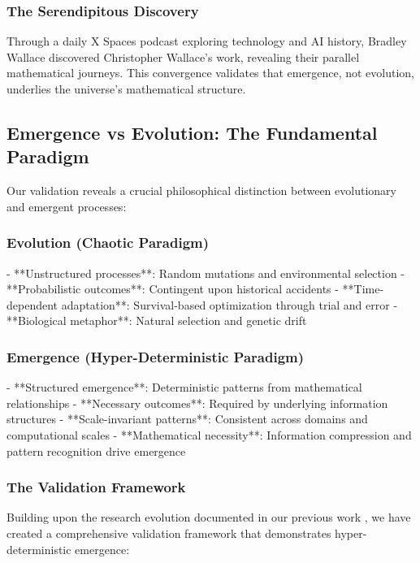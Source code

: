 \documentclass[12pt]{article}
\begin{document}
\subsubsection{The Serendipitous Discovery}

Through a daily X Spaces podcast exploring technology and AI history, Bradley Wallace discovered Christopher Wallace's work, revealing their parallel mathematical journeys. This convergence validates that emergence, not evolution, underlies the universe's mathematical structure.

\subsection{Emergence vs Evolution: The Fundamental Paradigm}

Our validation reveals a crucial philosophical distinction between evolutionary and emergent processes:

\subsubsection{Evolution (Chaotic Paradigm)}
- **Unstructured processes**: Random mutations and environmental selection
- **Probabilistic outcomes**: Contingent upon historical accidents
- **Time-dependent adaptation**: Survival-based optimization through trial and error
- **Biological metaphor**: Natural selection and genetic drift

\subsubsection{Emergence (Hyper-Deterministic Paradigm)}
- **Structured emergence**: Deterministic patterns from mathematical relationships
- **Necessary outcomes**: Required by underlying information structures
- **Scale-invariant patterns**: Consistent across domains and computational scales
- **Mathematical necessity**: Information compression and pattern recognition drive emergence

\subsubsection{The Validation Framework}

Building upon the research evolution documented in our previous work \cite{wallace_research_evolution}, we have created a comprehensive validation framework that demonstrates hyper-deterministic emergence:
\end{document}
